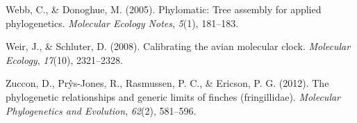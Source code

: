 \documentclass[english,man]{apa6}
\begin{document}
\leavevmode\hypertarget{ref-webb2005phylomatic}{}%
Webb, C., \& Donoghue, M. (2005). Phylomatic: Tree assembly for applied phylogenetics. \emph{Molecular Ecology Notes}, \emph{5}(1), 181--183.

\leavevmode\hypertarget{ref-weir2008calibrating}{}%
Weir, J., \& Schluter, D. (2008). Calibrating the avian molecular clock. \emph{Molecular Ecology}, \emph{17}(10), 2321--2328.

\leavevmode\hypertarget{ref-zuccon2012phylogenetic}{}%
Zuccon, D., Prŷs-Jones, R., Rasmussen, P. C., \& Ericson, P. G. (2012). The phylogenetic relationships and generic limits of finches (fringillidae). \emph{Molecular Phylogenetics and Evolution}, \emph{62}(2), 581--596.

\endgroup
\end{document}
